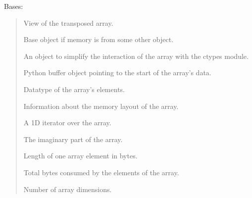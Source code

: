 \documentclass[letterpaper,10pt,english]{sphinxmanual}
\begin{document}
\begin{fulllineitems}
\label{\detokenize{CoolDwarf.utils.misc:CoolDwarf.utils.misc.ndarray.CallbackNDArray}}
\pysigstartsignatures
{}
\pysigstopsignatures
\sphinxAtStartPar
Bases: 
\begin{quote}\begin{description}
\begin{description}
\sphinxAtStartPar
View of the transposed array.

\sphinxAtStartPar
Base object if memory is from some other object.

\sphinxAtStartPar
An object to simplify the interaction of the array with the ctypes module.

\sphinxAtStartPar
Python buffer object pointing to the start of the array’s data.

\sphinxAtStartPar
Data\sphinxhyphen{}type of the array’s elements.

\sphinxAtStartPar
Information about the memory layout of the array.

\sphinxAtStartPar
A 1\sphinxhyphen{}D iterator over the array.

\sphinxAtStartPar
The imaginary part of the array.

\sphinxAtStartPar
Length of one array element in bytes.

\sphinxAtStartPar
Total bytes consumed by the elements of the array.

\sphinxAtStartPar
Number of array dimensions.


\end{description}
\end{description}
\end{quote}
\end{fulllineitems}
\end{document}
